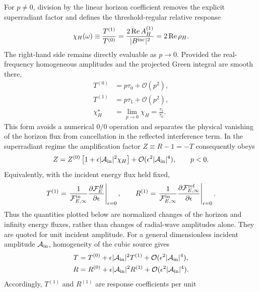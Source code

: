 \documentclass[aps,prd,twocolumn,10pt,nofootinbib,superscriptaddress,floatfix]{revtex4-2}
\newcommand{\calO}{\mathcal{O}}
\newcommand{\Bin}{B^{\rm inc}}
\newcommand{\AH}{A_H^{(1)}}
\begin{document}
For $p\ne0$, division by the linear horizon coefficient removes the explicit
superradiant factor and defines the threshold-regular relative response
\begin{equation}
\chi_H(\omega)
\equiv\frac{T^{(1)}}{T^{(0)}}
=\frac{2\operatorname{Re}\AH}{|\Bin|^2}
=2\operatorname{Re}\rho_H.
\label{eq:horizon_response}
\end{equation}
The right-hand side remains directly evaluable as $p\to0$.  Provided the
real-frequency homogeneous amplitudes and the projected Green integral are
smooth there,
\begin{align}
T^{(0)}&=p\tau_0+\calO(p^2),\nonumber\\
T^{(1)}&=p\tau_1+\calO(p^2),\nonumber\\
\chi_H^\star&=\lim_{p\to0}\chi_H=\frac{\tau_1}{\tau_0}.
\label{eq:threshold_scaling}
\end{align}
This form avoids a numerical $0/0$ operation and separates the physical
vanishing of the horizon flux from cancellation in the reflected interference
term.  In the superradiant regime the amplification factor
$Z\equiv R-1=-T$ consequently obeys
\begin{equation}
Z=Z^{(0)}\left[1+\epsilon|{\cal A}_{\rm in}|^2\chi_H\right]
+\calO(\epsilon^2|{\cal A}_{\rm in}|^4),\qquad p<0.
\label{eq:superradiant_amplification_response}
\end{equation}
Equivalently, with the incident energy flux held fixed,
\begin{equation}
T^{(1)}=\left.\frac{1}{\mathcal F_{E,\infty}^{\rm in}}
\frac{\partial\mathcal F_E^H}{\partial\epsilon}\right|_{\epsilon=0},
\qquad
R^{(1)}=\left.\frac{1}{\mathcal F_{E,\infty}^{\rm in}}
\frac{\partial\mathcal F_{E,\infty}^{\rm ref}}
{\partial\epsilon}\right|_{\epsilon=0}.
\label{eq:flux_derivative_definition}
\end{equation}
Thus the quantities plotted below are normalized changes of the horizon and
infinity energy fluxes, rather than changes of radial-wave amplitudes alone.
They are quoted for unit incident amplitude.  For a general dimensionless
incident amplitude ${\cal A}_{\rm in}$, homogeneity of the cubic source gives
\begin{align}
T={}&T^{(0)}+\epsilon|{\cal A}_{\rm in}|^2T^{(1)}
+\calO(\epsilon^2|{\cal A}_{\rm in}|^4),\nonumber\\
R={}&R^{(0)}+\epsilon|{\cal A}_{\rm in}|^2R^{(1)}
+\calO(\epsilon^2|{\cal A}_{\rm in}|^4).
\label{eq:amplitude_scaling}
\end{align}
Accordingly, $T^{(1)}$ and $R^{(1)}$ are response coefficients per unit
\end{document}
